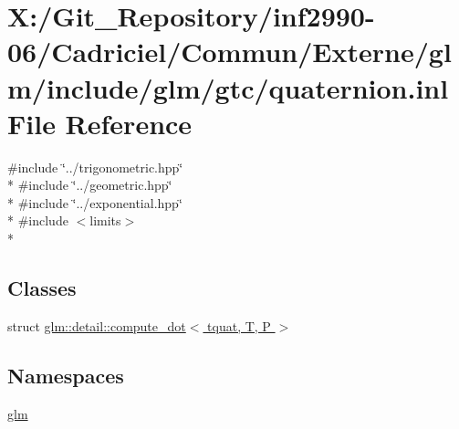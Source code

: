\hypertarget{glm_2include_2glm_2gtc_2quaternion_8inl}{\section{X\-:/\-Git\-\_\-\-Repository/inf2990-\/06/\-Cadriciel/\-Commun/\-Externe/glm/include/glm/gtc/quaternion.inl File Reference}
\label{glm_2include_2glm_2gtc_2quaternion_8inl}
}
{\ttfamily \#include \char`\"{}../trigonometric.\-hpp\char`\"{}}\\*
{\ttfamily \#include \char`\"{}../geometric.\-hpp\char`\"{}}\\*
{\ttfamily \#include \char`\"{}../exponential.\-hpp\char`\"{}}\\*
{\ttfamily \#include $<$limits$>$}\\*
\subsection*{Classes}
\begin{DoxyCompactItemize}
\item 
struct \hyperlink{structglm_1_1detail_1_1compute__dot_3_01tquat_00_01_t_00_01_p_01_4}{glm\-::detail\-::compute\-\_\-dot$<$ tquat, T, P $>$}
\end{DoxyCompactItemize}
\subsection*{Namespaces}
\begin{DoxyCompactItemize}
\item 
\hyperlink{namespaceglm}{glm}
\end{DoxyCompactItemize}

